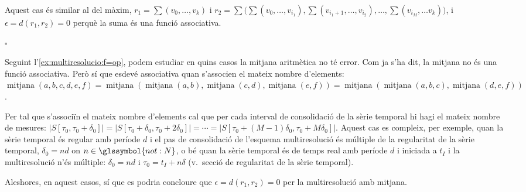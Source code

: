 \begin{example}
\begin{itemize}
    Aquest cas és similar al del màxim, $r_1=\sum(v_0,\dotsc, v_k)$ i
    $r_2=\sum\big( \sum(v_0,\dotsc,v_{i_1}),
    \sum(v_{i_1+1},\dotsc,v_{i_2}), \dotsc, \sum(v_{i_M}, \dotsc v_k)
    \big)$, i $\epsilon=d(r_1,r_2)=0$ perquè la suma és una funció
    associativa.
    



  \end{itemize}

$\square$
\end{example}






\begin{example}
  Seguint l'\autoref{ex:multiresolucio:f=op}, podem estudiar en quins
  casos la mitjana aritmètica no té error. Com ja s'ha dit, la mitjana
  no és una funció associativa. Però sí que esdevé associativa quan
  s'associen el mateix nombre d'elements:
  $\operatorname{mitjana}(a,b,c,d,e,f) = \operatorname{mitjana}(
  \operatorname{mitjana}(a,b), \operatorname{mitjana}(c,d),
  \operatorname{mitjana}(e,f)) = \operatorname{mitjana}(
  \operatorname{mitjana}(a,b,c), \operatorname{mitjana}(d,e,f))$.

  Per tal que s'associïn el mateix nombre d'elements cal que per cada
  interval de consolidació de la sèrie temporal hi hagi el mateix
  nombre de mesures:
  $|S[\tau_0,\tau_0+\delta_0]|=|S[\tau_0+\delta_0,\tau_0+2\delta_0]|=\dotsb
  = |S[\tau_0+(M-1)\delta_0,\tau_0+M\delta_0]|$.  Aquest cas es
  compleix, per exemple, quan la sèrie temporal és regular amb període
  $d$ i el pas de consolidació de l'esquema multiresolució és múltiple
  de la regularitat de la sèrie temporal, $\delta_0 = nd$ on
  $n\in\glssymbol{not:N}$, o bé quan la sèrie temporal és de temps
  real amb període $d$ i iniciada a $t_I$ i la multiresolució n'és
  múltiple: $\delta_0 = nd$ i $\tau_0 = t_I+n\delta$ (v.\ secció de
  regularitat de la sèrie temporal).

  Aleshores, en aquest casos, sí que es podria concloure que
  $\epsilon=d(r_1,r_2)=0$ per la multiresolució amb mitjana.
\end{example}





